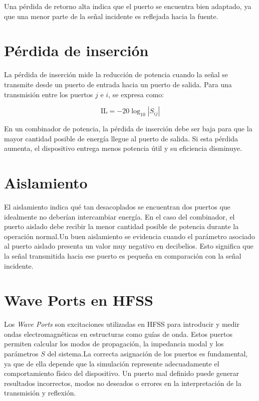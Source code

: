 Una pérdida de retorno alta indica que el puerto se encuentra bien adaptado, ya que una menor parte de la señal incidente es reflejada hacia la fuente.

\section{Pérdida de inserción}

La pérdida de inserción mide la reducción de potencia cuando la señal se transmite desde un puerto de entrada hacia un puerto de salida. Para una transmisión entre los puertos $j$ e $i$, se expresa como:

\begin{equation}
\text{IL} = -20\log_{10}\left|S_{ij}\right|
\end{equation}

En un combinador de potencia, la pérdida de inserción debe ser baja para que la mayor cantidad posible de energía llegue al puerto de salida. Si esta pérdida aumenta, el dispositivo entrega menos potencia útil y su eficiencia disminuye.

\section{Aislamiento}

El aislamiento indica qué tan desacoplados se encuentran dos puertos que idealmente no deberían intercambiar energía. En el caso del combinador, el puerto aislado debe recibir la menor cantidad posible de potencia durante la operación normal.Un buen aislamiento se evidencia cuando el parámetro asociado al puerto aislado presenta un valor muy negativo en decibelios. Esto significa que la señal transmitida hacia ese puerto es pequeña en comparación con la señal incidente.

\section{Wave Ports en HFSS}

Los \textit{Wave Ports} son excitaciones utilizadas en HFSS para introducir y medir ondas electromagnéticas en estructuras como guías de onda. Estos puertos permiten calcular los modos de propagación, la impedancia modal y los parámetros $S$ del sistema.La correcta asignación de los puertos es fundamental, ya que de ella depende que la simulación represente adecuadamente el comportamiento físico del dispositivo. Un puerto mal definido puede generar resultados incorrectos, modos no deseados o errores en la interpretación de la transmisión y reflexión.

